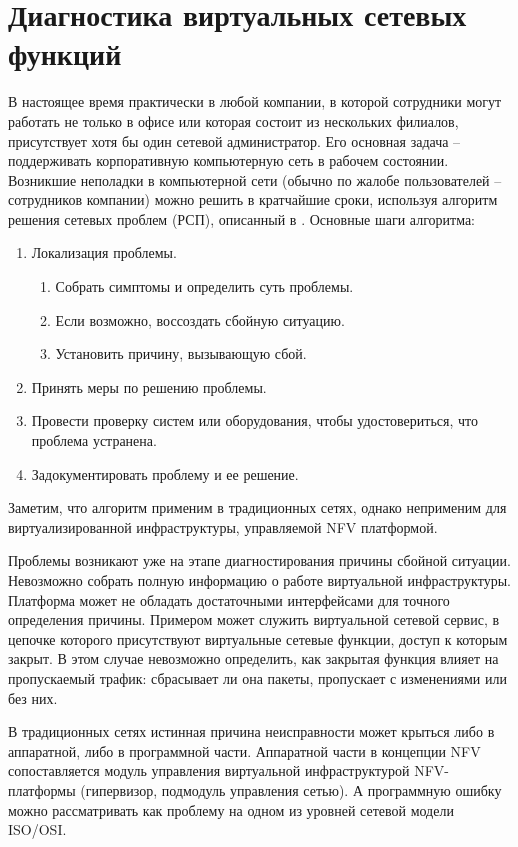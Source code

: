 \documentclass[oneside,final,14pt,a4paper]{extreport}
\begin{document}
\section{Диагностика виртуальных сетевых функций}
\label{sec:diagnosis_network_problems}

В настоящее время практически в любой компании, в которой сотрудники могут работать не только в офисе или которая состоит из нескольких филиалов, присутствует хотя бы один сетевой администратор. Его основная задача -- поддерживать корпоративную компьютерную сеть в рабочем состоянии. Возникшие неполадки в компьютерной сети (обычно по жалобе пользователей -- сотрудников компании) можно решить в кратчайшие сроки, используя алгоритм решения сетевых проблем (РСП), описанный в \cite{bib:troubleshotuin_network_problems}. Основные шаги алгоритма:
\begin{enumerate}
    \item Локализация проблемы.
    \begin{enumerate}
        \item Собрать симптомы и определить суть проблемы.
        \item Если возможно, воссоздать сбойную ситуацию.
        \item Установить причину, вызывающую сбой.
    \end{enumerate}
    \item Принять меры по решению проблемы.
    \item Провести проверку систем или оборудования, чтобы удостовериться, что проблема устранена.
    \item Задокументировать проблему и ее решение.
\end{enumerate}

Заметим, что алгоритм применим в традиционных сетях, однако неприменим для виртуализированной инфраструктуры, управляемой NFV платформой.

Проблемы возникают уже на этапе диагностирования причины сбойной ситуации. Невозможно собрать полную информацию о работе виртуальной инфраструктуры. Платформа может не обладать достаточными интерфейсами для точного определения причины. Примером может служить виртуальной сетевой сервис, в цепочке которого присутствуют виртуальные сетевые функции, доступ к которым закрыт. В этом случае невозможно определить, как закрытая функция влияет на пропускаемый трафик: сбрасывает ли она пакеты, пропускает с изменениями или без них.

В традиционных сетях истинная причина неисправности может крыться либо в аппаратной, либо в программной части. Аппаратной части в концепции NFV сопоставляется модуль управления виртуальной инфраструктурой NFV-платформы (гипервизор, подмодуль управления сетью). А программную ошибку можно рассматривать как проблему на одном из уровней сетевой модели ISO/OSI.
\end{document}
